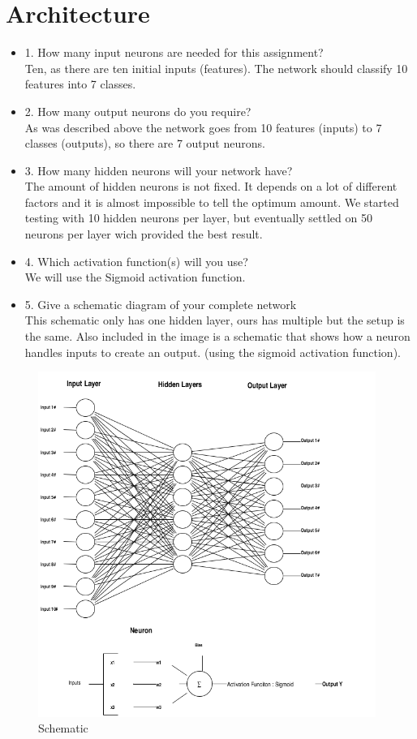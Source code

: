 
\section{Architecture} 
\label {chapter:architecture}
\begin{itemize}
\item 1. How many input neurons are needed for this assignment?\\
Ten, as there are ten initial inputs (features). The network should classify 10 features into 7 classes.
\item 2. How many output neurons do you require?\\
As was described above the network goes from 10 features (inputs) to 7 classes (outputs), so there are 7 output neurons.
\item 3. How many hidden neurons will your network have?\\
The amount of hidden neurons is not fixed. It depends on a lot of different factors and it is almost impossible to tell the optimum amount. We started testing with 10 hidden neurons per layer, but eventually settled on 50 neurons per layer wich provided the best result.
\item 4. Which activation function(s) will you use?\\
We will use the Sigmoid activation function.
\item 5. Give a schematic diagram of your complete network\\
This schematic only has one hidden layer, ours has multiple but the setup is the same. Also included in the image is a schematic that shows how a neuron handles inputs to create an output.
(using the sigmoid activation function).
\end{itemize}

\begin{figure}[!h]
\begin{center}
\includegraphics[width=11cm]{images/schemeit-project.png}
\caption{Schematic }
\label{schematic}
\end{center}
\end{figure}
\FloatBarrier

